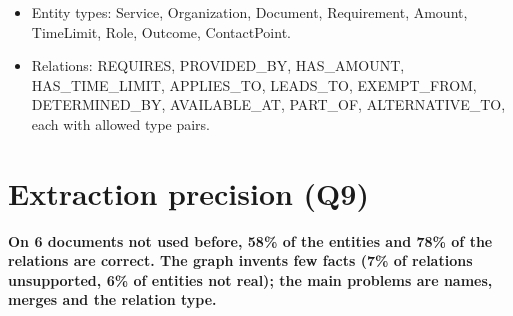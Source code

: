 \documentclass[11pt,a4paper]{article}
\begin{document}
\begin{itemize}
\item Entity types: Service, Organization, Document, Requirement, Amount, TimeLimit, Role, Outcome,
  ContactPoint.
\item Relations: REQUIRES, PROVIDED\_BY, HAS\_AMOUNT, HAS\_TIME\_LIMIT, APPLIES\_TO, LEADS\_TO,
  EXEMPT\_FROM, DETERMINED\_BY, AVAILABLE\_AT, PART\_OF, ALTERNATIVE\_TO, each with allowed type
  pairs.
\end{itemize}

\section{Extraction precision (Q9)}\label{sec:precision}

\textbf{On 6 documents not used before, 58\% of the entities and 78\% of the relations are correct. The graph
invents few facts (7\% of relations unsupported, 6\% of entities not real); the main problems are names, merges
and the relation type.}
\end{document}

